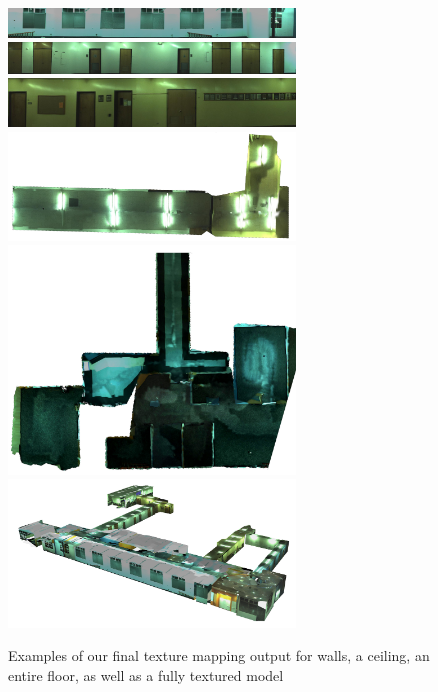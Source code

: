 \documentclass[10pt,twocolumn,letterpaper]{article}
\begin{document}
\begin{figure}
  \centering
  \includegraphics[width=3in]{4thfloor21.jpg}
  \includegraphics[width=3in]{4thfloor61.jpg}
  \includegraphics[width=3in]{wall3final.jpg}
  \includegraphics[width=3in]{4thfloor8.jpg}
  \includegraphics[width=3in]{floorcropped.jpg}
  \includegraphics[width=3in]{fullmodel.png}
  \caption{Examples of our final texture mapping output for walls, a
    ceiling, an entire floor, as well as a fully textured model}
  \label{fig:results}
\end{figure}

{\small   }
\end{document}
